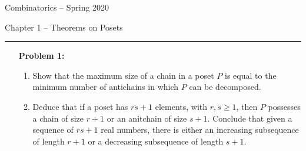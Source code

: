 \documentclass{amsart}
\theoremstyle{plain}
\begin{document}
{\Large Combinatorics -- Spring 2020}






{\Large Chapter 1 -- Theorems on Posets}

\vspace{0.5cm}

 \hrule

\vspace{0.5cm}

\begin{enumerate}


\item[\textbf{Problem 1:}]
    \begin{enumerate}
        \item Show that the maximum size of a chain in a poset $P$ is equal to the minimum number of antichains in which $P$ can be decomposed.
        \item Deduce that if a poset has $rs + 1$ elements, with $r,s \geq 1$, then $P$ possesses a chain of size $r+1$ or an anitchain of size $s+1$. Conclude that given a sequence of $rs + 1$ real numbers, there is either an increasing subsequence of length $r+1$ or a decreasing subsequence of length $s+1$.
    \end{enumerate}
\end{enumerate}
%
%
\end{document}
